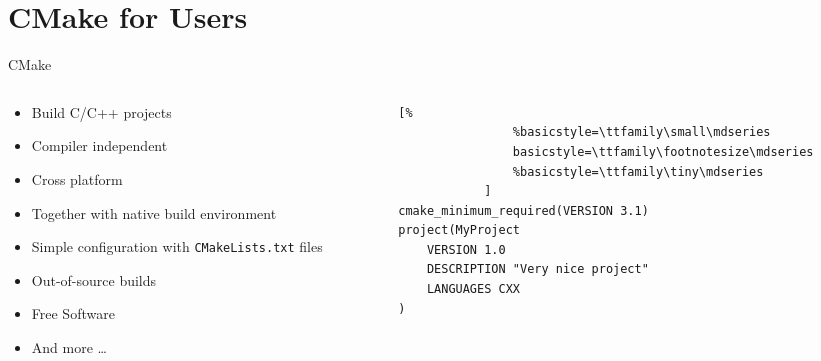 \documentclass[t]{beamer}
\begin{document}
\section{CMake for Users}


\begin{frame}[fragile]{CMake}
    \begin{columns}[T]
        \begin{column}{0.4\textwidth}
            \begin{itemize}
                \item Build C/C++ projects
                \item Compiler independent
                \item Cross platform
                \item Together with native build environment
                \item Simple configuration with \texttt{CMakeLists.txt}
                    files
                \item Out-of-source builds
                \item Free Software
                \item And more …
            \end{itemize}
        \end{column}
        \begin{column}{0.6\textwidth}
            \begin{lstlisting}[%
                %basicstyle=\ttfamily\small\mdseries
                basicstyle=\ttfamily\footnotesize\mdseries
                %basicstyle=\ttfamily\tiny\mdseries
            ]
cmake_minimum_required(VERSION 3.1)
project(MyProject
    VERSION 1.0
    DESCRIPTION "Very nice project"
    LANGUAGES CXX
)
            \end{lstlisting}
        \end{column}
    \end{columns}
\end{frame}
\end{document}
